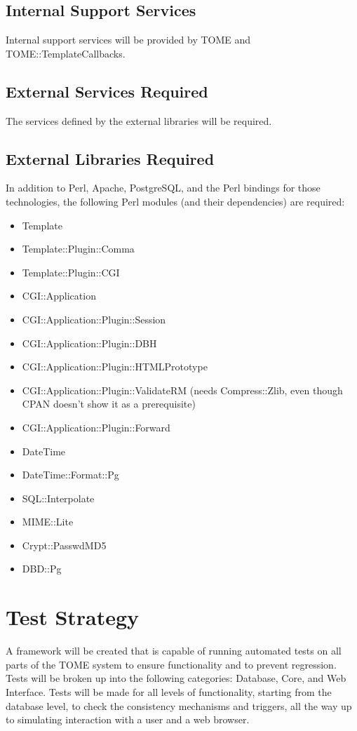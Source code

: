\documentclass[12pt,titlepage]{article}
\begin{document}
\subsection{Internal Support Services}
Internal support services will be provided by TOME and TOME::TemplateCallbacks.
\subsection{External Services Required}
The services defined by the external libraries will be required.
\subsection{External Libraries Required}
In addition to Perl, Apache, PostgreSQL, and the Perl bindings for those technologies, the following Perl modules (and their dependencies) are required:
\begin{itemize}
	\item Template
	\item Template::Plugin::Comma
	\item Template::Plugin::CGI
	\item CGI::Application
	\item CGI::Application::Plugin::Session
	\item CGI::Application::Plugin::DBH
	\item CGI::Application::Plugin::HTMLPrototype
	\item CGI::Application::Plugin::ValidateRM (needs Compress::Zlib, even though CPAN doesn't show it as a prerequisite)
	\item CGI::Application::Plugin::Forward
	\item DateTime
	\item DateTime::Format::Pg
	\item SQL::Interpolate
	\item MIME::Lite
	\item Crypt::PasswdMD5
	\item DBD::Pg
\end{itemize}
\section{Test Strategy}
A framework will be created that is capable of running automated tests on all parts of the TOME system to ensure functionality and to prevent regression.  Tests will be broken up into the following categories: Database, Core, and Web Interface.  Tests will be made for all levels of functionality, starting from the database level, to check the consistency mechanisms and triggers, all the way up to simulating interaction with a user and a web browser.
\end{document}

